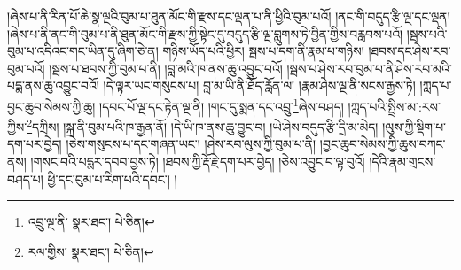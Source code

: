 །ཞེས་པ་ནི་རིན་པོ་ཆེ་སྣ་ལྔའི་བུམ་པ་ཐུན་མོང་གི་རྫས་དང་ལྡན་པ་ནི་ཕྱིའི་བུམ་པའོ། །ནང་གི་བདུད་རྩི་ལྔ་དང་ལྡན། །ཞེས་པ་ནི་ནང་གི་བུམ་པ་ནི་ཐུན་མོང་གི་རྫས་ཀྱི་སྟེང་དུ་བདུད་རྩི་ལྔ་བླུགས་ཏེ་བྱིན་གྱིས་བརླབས་པའོ། །སྦས་པའི་བུམ་པ་འདིའང་གང་ཡིན་དུ་ཞིག་ཅེ་ན། གཉིས་ཡོད་པའི་ཕྱིར། སྦས་པ་དག་ནི་རྣམ་པ་གཉིས། །ཐབས་དང་ཤེས་རབ་བུམ་པའོ། །སྦས་པ་ཐབས་ཀྱི་བུམ་པ་ནི། །བླ་མའི་ཁ་ནས་ཆུ་འབྱུང་བའོ། །སྦས་པ་ཤེས་རབ་བུམ་པ་ནི་ཤེས་རབ་མའི་པདྨ་ནས་ཆུ་འབྱུང་བའོ། །དེ་ལྟར་ཡང་གསུངས་པ། བླ་མ་ཡི་ནི་ཐོད་རློན་ལ། །རྣམ་ཤེས་ལྔ་ནི་སངས་རྒྱས་ཏེ། །ཀླད་པ་བྱང་ཆུབ་སེམས་ཀྱི་ཆུ། །དབང་པོ་ལྔ་དང་རྟེན་ལྔ་ནི། །གང་དུ་སྨན་དང་འབྲུ་\footnote{འབྲུ་ལྔ་ནི་  སྣར་ཐང་།  པེ་ཅིན། }ཞེས་བཤད། །ཀླད་པའི་སྤྲིས་མ་:རས་ཀྱིས་\footnote{རལ་གྱིས་  སྣར་ཐང་།  པེ་ཅིན། }དཀྲིས། །སྐྲ་ནི་བུམ་པའི་ཁ་རྒྱན་ནོ། །དེ་ཡི་ཁ་ནས་ཆུ་བྱུང་བ། །ཡེ་ཤེས་བདུད་རྩི་དྲི་མ་མེད། །ལུས་ཀྱི་སྡིག་པ་དག་པར་བྱེད། །ཅེས་གསུངས་པ་དང་གཞན་ཡང་། །ཤེས་རབ་ལུས་ཀྱི་བུམ་པ་ནི། །བྱང་ཆུབ་སེམས་ཀྱི་ཆུས་བཀང་ནས། །གསང་བའི་པདྨར་དབབ་བྱས་ཏེ། །ཐབས་ཀྱི་རྡོ་རྗེ་དག་པར་བྱེད། །ཅེས་འབྱུང་བ་ལྟ་བུའོ། །དེའི་རྣམ་གྲངས་བཤད་པ། ཕྱི་དང་བུམ་པ་རིག་པའི་དབང་། །
